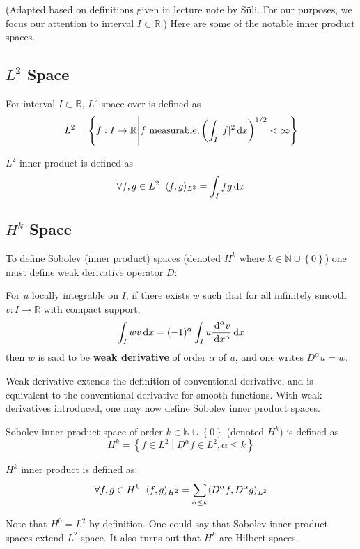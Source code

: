 \documentclass[../dissertation.tex]{subfiles}
\begin{document}
(Adapted based on definitions given in lecture note by S\"uli\cite{nspde}.
For our purposes, we focus our attention to interval $I \subset \mathbb{R}$.)
Here are some of the notable inner product spaces.
\subsection{$L^2$ Space}
\begin{definition}[$L^2$ Space]
    For interval $I \subset \mathbb{R}$,
    $L^2$ space over is defined as
    \begin{equation}
        L^2 = \left\{ f:I \rightarrow \mathbb{R} \middle| f \text{ measurable}, \left( \int_{I} |f|^2 \, \text{d} x \right)^{1/2} < \infty  \right\}
    \end{equation}

    $L^2$ inner product is defined as
    \begin{equation}
        \forall f,g \in L^2 \; \; \langle f, g \rangle_{L^2} = \int_I f g \, \text{d} x
    \end{equation}
\end{definition}

\subsection{$H^k$ Space}
To define Sobolev (inner product) spaces (denoted $H^k$ where $k \in \mathbb{N} \cup \left\{ 0 \right\}$)
one must define weak derivative operator $D$:
\begin{definition}
    For $u$ locally integrable on $I$, if there exists $w$ such that for all infinitely smooth $v:I \rightarrow \mathbb{R}$ with compact support,
    \begin{equation}
        \int_{I} w v \, \text{d} x = (-1)^{\alpha} \int_{I} u \frac{\, \text{d}^{\alpha} v}{\, \text{d} x^{\alpha}} \, \text{d} x
    \end{equation}
    then $w$ is said to be \textbf{weak derivative} of order $\alpha$ of $u$, and one writes $D^{\alpha}u = w$.
\end{definition}

Weak derivative extends the definition of conventional derivative, and is equivalent to the conventional derivative for smooth functions.
With weak derivatives introduced, one may now define Sobolev inner product spaces.
\begin{definition}[$H^k$ Space]
    Sobolev inner product space of order $k \in \mathbb{N} \cup \left\{ 0 \right\}$ (denoted $H^k$) is defined as
    \begin{equation}
        H^k = \left\{ f \in L^2 \left.\middle|\right. D^{\alpha} f \in L^2, \alpha \leq k \right\}
    \end{equation}

    $H^k$ inner product is defined as:
    \begin{equation}
        \forall f,g \in H^{k} \; \; \langle f, g \rangle_{H^2} = \sum_{\alpha \leq k} \langle D^\alpha f, D^\alpha g \rangle_{L^2}
    \end{equation}
\end{definition}

\begin{remark}
    Note that $H^0 = L^2$ by definition.
    One could say that Sobolev inner product spaces extend $L^2$ space.
    It also turns out that $H^k$ are Hilbert spaces.
\end{remark}
\end{document}
